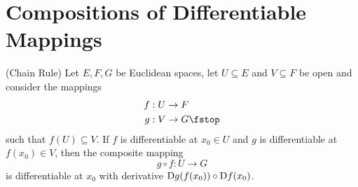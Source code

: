 \section{Compositions of Differentiable Mappings}
\label{sec:Chain-rule}
\begin{theorem}
  (Chain Rule) Let \( E, F, G \) be Euclidean spaces, let \( U\subseteq E \) and \( V\subseteq F \) be open and consider the mappings
  \begin{align*}
    f&:U\to F\\
    g&:V\to G\fstop
  \end{align*}
  such that \( f(U)\subseteq V \). If \( f \) is differentiable at \( x_0\in U \) and \( g \) is differentiable at \( f(x_0)\in V \), then the composite mapping
  \[ g\circ f:U\to G \]
  is differentiable at \( x_0 \) with derivative \( \text{D} g(f(x_0))\circ\text{D} f(x_0) \).
\end{theorem}
